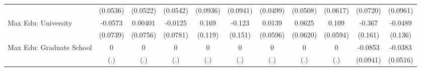 {\begin{tabular}{l*{10}{c}}
            &    (0.0536)         &    (0.0522)         &    (0.0542)         &    (0.0936)         &    (0.0941)         &    (0.0499)         &    (0.0508)         &    (0.0617)         &    (0.0720)         &    (0.0961)         \\
\addlinespace
Max Edu: University&     -0.0573         &     0.00401         &     -0.0125         &       0.169         &      -0.123         &      0.0139         &      0.0625         &       0.109         &      -0.367\sym{*}  &     -0.0489         \\
            &    (0.0739)         &    (0.0756)         &    (0.0781)         &     (0.119)         &     (0.151)         &    (0.0596)         &    (0.0620)         &    (0.0594)         &     (0.161)         &     (0.136)         \\
\addlinespace
Max Edu: Graduate School&           0         &           0         &           0         &           0         &           0         &           0         &           0         &           0         &     -0.0853         &     -0.0383         \\
            &         (.)         &         (.)         &         (.)         &         (.)         &         (.)         &         (.)         &         (.)         &         (.)         &    (0.0941)         &    (0.0516)         \\
\bottomrule
\end{tabular}
}
